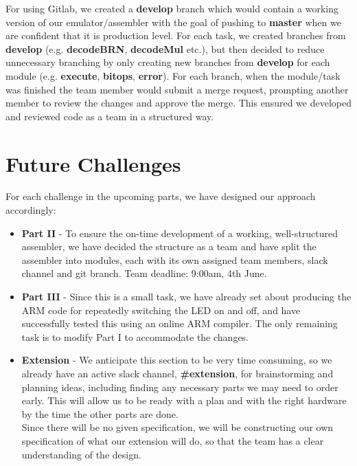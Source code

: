 \documentclass[10pt,twoside]{article}
\begin{document}
For using Gitlab, we created a \textbf{develop} branch which would contain a working version of our emulator/assembler with the goal of pushing to \textbf{master} when we are confident that it is production level. For each task, we created branches from \textbf{develop} (e.g. \textbf{decodeBRN}, \textbf{decodeMul} etc.), but then decided to reduce unnecessary branching by only creating new branches from \textbf{develop} for each module (e.g. \textbf{execute}, \textbf{bitops}, \textbf{error}). For each branch, when the module/task was finished the team member would submit a merge request, prompting another member to review the changes and approve the merge. This ensured we developed and reviewed code as a team in a structured way.

\section{Future Challenges}

For each challenge in the upcoming parts, we have designed our approach accordingly:
\begin{itemize}

\item \textbf{Part II} - To ensure the on-time development of a working, well-structured assembler, we have decided the structure as a team and have split the assembler into modules, each with its own assigned team members, slack channel and git branch. Team deadline: 9:00am, 4th June.
\item \textbf{Part III} - Since this is a small task, we have already set about producing the ARM code for repeatedly switching the LED on and off, and have successfully tested this using an online ARM compiler. The only remaining task is to modify Part I to accommodate the changes. 
\item \textbf{Extension} - We anticipate this section to be very time consuming, so we already have an active slack channel, \textbf{\#extension}, for brainstorming and planning ideas, including finding any necessary parts we may need to order early. This will allow us to be ready with a plan and with the right hardware by the time the other parts are done. \\
Since there will be no given specification, we will be constructing our own specification of what our extension will do, so that the team has a clear understanding of the design.
\end{itemize}
\end{document}

